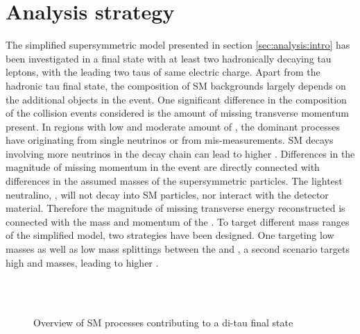 \section{Analysis strategy}
\label{sec:analysis:strategy}
The simplified supersymmetric model presented in section \ref{sec:analysis:intro} has been investigated in a final state with at least two hadronically decaying tau leptons,  with the leading two taus of same electric charge.  
Apart from the hadronic tau final state,  the composition of \ac{SM} backgrounds largely depends on the additional objects in the event.  One significant difference in the composition of the collision events considered is the amount of missing transverse momentum present.
In regions with low and moderate amount of \Met, the dominant processes have \Met originating from single neutrinos or from mis-measurements.  \ac{SM} decays involving more neutrinos in the decay chain can lead to higher \Met. 
Differences in the magnitude of missing momentum in the event are directly connected with differences in the assumed masses of the supersymmetric particles.  The lightest neutralino, \None ,  will not decay into \ac{SM} particles,  nor interact with the detector material.  Therefore the magnitude of missing transverse energy reconstructed is connected with the mass and momentum of the \None.
To target different mass ranges of the simplified model,  two strategies have been designed.  One targeting low \None masses as well as low mass splittings between the \None and \Cone,  a second scenario targets high \None and \Cone masses,  leading to higher \Met. 

\begin{figure}[!htpb]
\centering
{}
\\
\\
\caption{Overview of \ac{SM} processes contributing to a di-tau final state \label{fig:bkgestimation:feynmanOverview}}
\end{figure}

